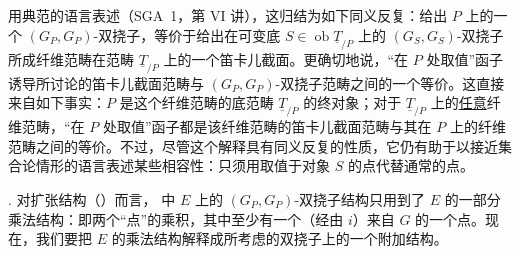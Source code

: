 
用典范的语言表述（SGA~1，第 VI 讲），这归结为如下同义反复：给出 $P$ 上的一个 $(G_P,G_P)$-双挠子，等价于给出在可变底 $S\in\operatorname{ob}\underline T_{/P}$ 上的 $(G_S,G_S)$-双挠子所成纤维范畴在范畴 $\underline T_{/P}$ 上的一个笛卡儿截面。更确切地说，“在 $P$ 处取值”函子诱导所讨论的笛卡儿截面范畴与 $(G_P,G_P)$-双挠子范畴之间的一个等价。这直接来自如下事实：$P$ 是这个纤维范畴的底范畴 $\underline T_{/P}$ 的终对象；对于 $\underline T_{/P}$ 上的\underline{任意}纤维范畴，“在 $P$ 处取值”函子都是该纤维范畴的笛卡儿截面范畴与其在 $P$ 上的纤维范畴之间的等价。不过，尽管这个解释具有同义反复的性质，它仍有助于以接近集合论情形的语言表述某些相容性：只须用取值于对象 $S$ 的点代替通常的点。




. 对扩张结构（）而言， 中 $E$ 上的 $(G_P,G_P)$-双挠子结构只用到了 $E$ 的一部分乘法结构：即两个“点”的乘积，其中至少有一个（经由 $i$）来自 $G$ 的一个点。现在，我们要把 $E$ 的乘法结构解释成所考虑的双挠子上的一个附加结构。


